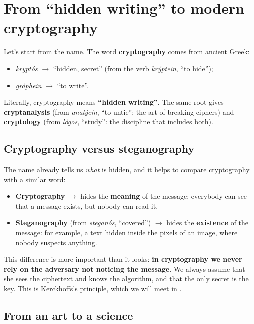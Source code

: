 
\section{From ``hidden writing'' to modern cryptography}

Let's start from the name. The word \textbf{cryptography} comes from ancient Greek:
\begin{itemize}
  \item \textit{kryptós} $\to$ ``hidden, secret'' (from the verb \textit{krýptein}, ``to hide'');
  \item \textit{gráphein} $\to$ ``to write''.
\end{itemize}
Literally, cryptography means \textbf{``hidden writing''}. The same root gives \textbf{cryptanalysis} (from \textit{analýein}, ``to untie'': the art of breaking ciphers) and \textbf{cryptology} (from \textit{lógos}, ``study'': the discipline that includes both).

\subsection{Cryptography versus steganography}

The name already tells us \textit{what} is hidden, and it helps to compare cryptography with a similar word:
\begin{itemize}
  \item \textbf{Cryptography} $\to$ hides the \textbf{meaning} of the message: everybody can see that a message exists, but nobody can read it.
  \item \textbf{Steganography} (from \textit{steganós}, ``covered'') $\to$ hides the \textbf{existence} of the message: for example, a text hidden inside the pixels of an image, where nobody suspects anything.
\end{itemize}
This difference is more important than it looks: \textbf{in cryptography we never rely on the adversary not noticing the message}. We always assume that she sees the ciphertext and knows the algorithm, and that the only secret is the key. This is Kerckhoffs's principle, which we will meet in .

\subsection{From an art to a science}

